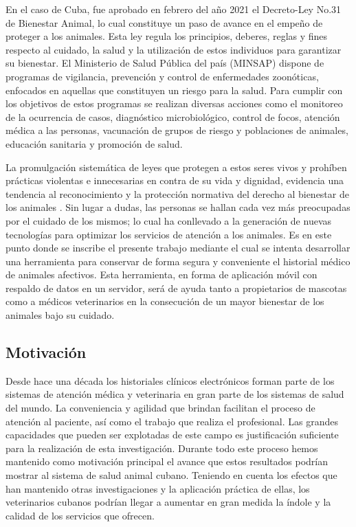 En el caso de Cuba, fue aprobado en febrero del año 2021 el Decreto-Ley No.31 de Bienestar Animal, lo cual constituye un paso de avance en el empeño de proteger a los animales. Esta ley regula los principios, deberes, reglas y fines respecto al cuidado, la salud y la utilización de estos individuos para garantizar su bienestar. El Ministerio de Salud Pública del país (MINSAP) dispone de programas de vigilancia, prevención y control de enfermedades zoonóticas, enfocados en aquellas que constituyen un riesgo para la salud. Para cumplir con los objetivos de estos programas se realizan diversas acciones como el monitoreo de la ocurrencia de casos, diagnóstico microbiológico, control de focos, atención médica a las personas, vacunación de grupos de riesgo y poblaciones de animales, educación sanitaria y promoción de salud. 

La promulgación sistemática de leyes que protegen a estos seres vivos y prohíben prácticas violentas e innecesarias en contra de su vida y dignidad, evidencia una tendencia al reconocimiento y la protección normativa del derecho al bienestar de los animales . Sin lugar a dudas, las personas se hallan cada vez más preocupadas por el cuidado de los mismos; lo cual ha conllevado a la generación de nuevas tecnologías para optimizar los servicios de atención a los animales. Es en este punto donde se inscribe el presente trabajo mediante el cual se intenta desarrollar una herramienta para conservar de forma segura y conveniente el historial médico de animales afectivos. Esta herramienta, en forma de aplicación móvil con respaldo de datos en un servidor, será de ayuda tanto a propietarios de mascotas como a médicos veterinarios en la consecución de un mayor bienestar de los animales bajo su cuidado. 


\subsection*{Motivaci\'on}

Desde hace una d\'ecada los historiales clínicos electr\'onicos forman parte de los sistemas de atenci\'on médica y veterinaria en gran parte de los sistemas de salud del mundo. La conveniencia y agilidad que brindan facilitan el proceso de atenci\'on al paciente, as\'i como el trabajo que realiza el profesional. Las grandes capacidades que pueden ser explotadas de este campo es justificaci\'on suficiente para la realizaci\'on de esta investigaci\'on. Durante todo este proceso hemos mantenido como motivaci\'on principal el avance que estos resultados podr\'ian mostrar al sistema de salud animal cubano. Teniendo en cuenta los efectos que han mantenido otras investigaciones y la aplicaci\'on pr\'actica de ellas, los veterinarios cubanos podr\'ian llegar a aumentar en gran medida la \'indole y la calidad de los servicios que ofrecen.

